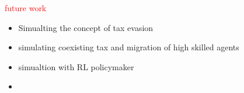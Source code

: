 \textcolor{red}{ future work}

\begin{itemize}
    \item Simualting the concept of tax evasion
    \item simulating coexisting tax and migration of high skilled agents
    \item simualtion with RL policymaker
    \item 
\end{itemize}